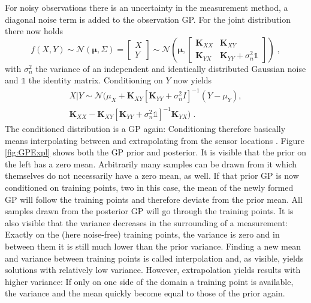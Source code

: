 \documentclass[%
  a4paper,oneside,%
  11pt,%
  smallchapters,
  style=printdev,
  extramargin,
  green,%
  rgb, <cmyk>
  ]{tubsbook}
\begin{document}
For noisy observations there is an uncertainty in the measurement method, a diagonal noise term is added to the observation GP. For the joint distribution there now holds
\begin{equation}
f(X,Y) \sim \mathcal{N}(\bm{\mu},\Sigma) = \begin{bmatrix}
           X \\
           Y
         \end{bmatrix} \sim \mathcal{N}\left( \bm{\mu}, \begin{bmatrix}
\bm{K}_{XX} & \bm{K}_{XY} \\
\bm{K}_{YX} & \bm{K}_{YY} + \sigma_n^2 \bm{\mathbb{1}} 
\end{bmatrix}  \right) \; ,
\label{eqn:noiseJoint}
\end{equation}
with $\sigma_n^2$ the variance of an independent and identically distributed Gaussian noise and $\mathbb{1}$ the identity matrix. Conditioning on $Y$ now yields
\begin{equation}
\begin{aligned}
X|Y \sim \mathcal{N}(\mu_X +\bm{K}_{XY} [\bm{K}_{YY}+ \sigma_n^2 I ]^{-1}(Y-\mu_Y), \\
\bm{K}_{XX} - \bm{K}_{XY}[\bm{K}_{YY}+ \sigma_n^2 \mathbb{1} ]^{-1}\bm{K}_{YX} ) \;.
\end{aligned}
\label{eqn:ConditioningDistr}
\end{equation}
The conditioned distribution is a GP again: Conditioning therefore basically means interpolating between and extrapolating from the sensor locations \cite{damianou2021}. 
%
%
Figure \ref{fig:GPExpl} shows both the GP prior and posterior. It is visible that the prior on the left has a zero mean. Arbitrarily many samples can be drawn from it which themselves do not necessarily have a zero mean, as well. If that prior GP is now conditioned on training points, two in this case, the mean of the newly formed GP will follow the training points and therefore deviate from the prior mean. All samples drawn from the posterior GP will go through the training points.  It is also visible that the variance decreases in the surrounding of a measurement: Exactly on the (here noise-free) training points, the variance is zero and in between them it is still much lower than the prior variance. Finding a new mean and variance between training points is called interpolation and, as visible, yields solutions with relatively low variance. However, extrapolation yields results with higher variance: If only on one side of the domain a training point is available, the variance and the mean quickly become equal to those of the prior again.
\end{document}
